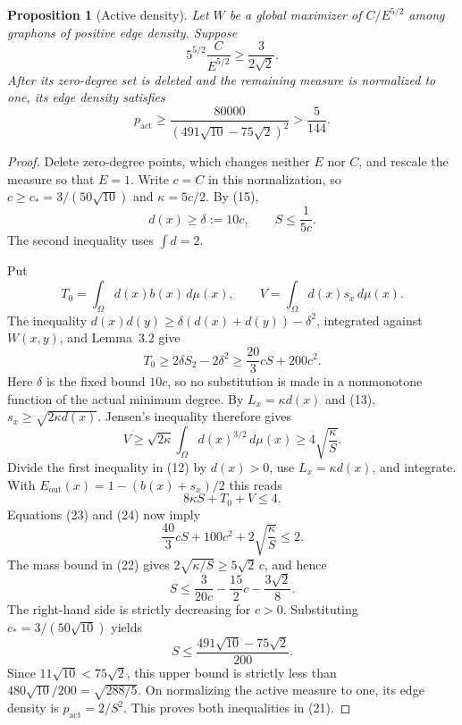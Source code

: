 \documentclass[11pt]{amsart}
\newtheorem{proposition}[theorem]{Proposition}
\theoremstyle{definition}
\theoremstyle{remark}
\begin{document}
\begin{proposition}[Active density]\label{prop:active-density}
Let \(W\) be a global maximizer of \(C/E^{5/2}\) among graphons of
positive edge density. Suppose
\[
 5^{5/2}\frac{C}{E^{5/2}}\ge\frac{3}{2\sqrt2}.
\]
After its zero-degree set is deleted and the remaining measure is
normalized to one, its edge density satisfies
\begin{equation}
 p_{\mathrm{act}}\ge
 \frac{80000}{(491\sqrt{10}-75\sqrt2)^2}>\frac5{144}.\tag{21}
\end{equation}
\end{proposition}
\begin{proof}
Delete zero-degree points, which changes neither \(E\) nor \(C\), and
rescale the measure so that \(E=1\). Write \(c=C\) in this normalization,
so \(c\ge c_*=3/(50\sqrt{10})\) and \(\kappa=5c/2\). By (15),
\begin{equation}
 d(x)\ge\delta:=10c,\qquad S\le\frac1{5c}.\tag{22}
\end{equation}
The second inequality uses \(\int d=2\).

Put
\[
 T_0=\int_\Omega d(x)b(x)\,d\mu(x),\qquad
 V=\int_\Omega d(x)s_x\,d\mu(x).
\]
The inequality
\(d(x)d(y)\ge\delta(d(x)+d(y))-\delta^2\), integrated against \(W(x,y)\),
and Lemma~3.2 give
\begin{equation}
 T_0\ge2\delta S_2-2\delta^2
       \ge\frac{20}{3}cS+200c^2.\tag{23}
\end{equation}
Here \(\delta\) is the fixed bound \(10c\), so no substitution is made in
a nonmonotone function of the actual minimum degree. By
\(L_x=\kappa d(x)\) and (13), \(s_x\ge\sqrt{2\kappa d(x)}\).
Jensen's inequality therefore gives
\begin{equation}
 V\ge\sqrt{2\kappa}\int_\Omega d(x)^{3/2}\,d\mu(x)
       \ge4\sqrt{\frac{\kappa}{S}}.\tag{24}
\end{equation}
Divide the first inequality in (12) by \(d(x)>0\), use
\(L_x=\kappa d(x)\), and integrate. With
\(E_{\mathrm{out}}(x)=1-(b(x)+s_x)/2\) this reads
\[
 8\kappa S+T_0+V\le4.
\]
Equations (23) and (24) now imply
\[
 \frac{40}{3}cS+100c^2+2\sqrt{\frac{\kappa}{S}}\le2.
\]
The mass bound in (22) gives \(2\sqrt{\kappa/S}\ge5\sqrt2\,c\), and hence
\[
 S\le\frac3{20c}-\frac{15}{2}c-\frac{3\sqrt2}{8}.
\]
The right-hand side is strictly decreasing for \(c>0\). Substituting
\(c_*=3/(50\sqrt{10})\) yields
\[
 S\le\frac{491\sqrt{10}-75\sqrt2}{200}.
\]
Since \(11\sqrt{10}<75\sqrt2\), this upper bound is strictly less than
\(480\sqrt{10}/200=\sqrt{288/5}\). On normalizing the active measure to
one, its edge density is \(p_{\mathrm{act}}=2/S^2\). This proves both
inequalities in (21).
\end{proof}
\end{document}

